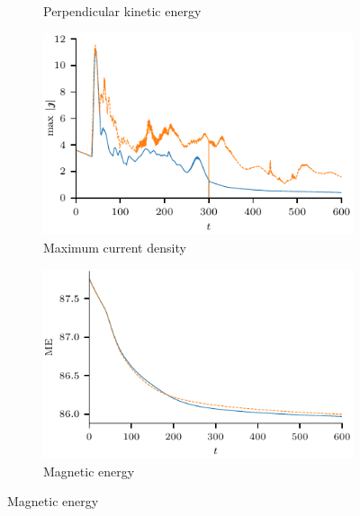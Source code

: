 \begin{figure}[t]
\begin{subfigure}[t]{0.49\textwidth}
      \caption{Perpendicular kinetic energy}
      \label{fig:perp_kinetic_energy_over_time}
    \end{subfigure}
    \begin{subfigure}[t]{0.49\textwidth}
      \centering
      \includegraphics[width=\linewidth]{current_density_over_time.pdf}
      \caption{Maximum current density}
      \label{fig:current_density_over_time}
    \end{subfigure}
    \begin{subfigure}[t]{0.49\textwidth}
      \centering
      \includegraphics[width=\linewidth]{magnetic_energy_density_over_time.pdf}
      \caption{Magnetic energy}
      \label{fig:magnetic_energy_density_over_time}
    \end{subfigure}
    \label{fig:energies}
\end{figure}


